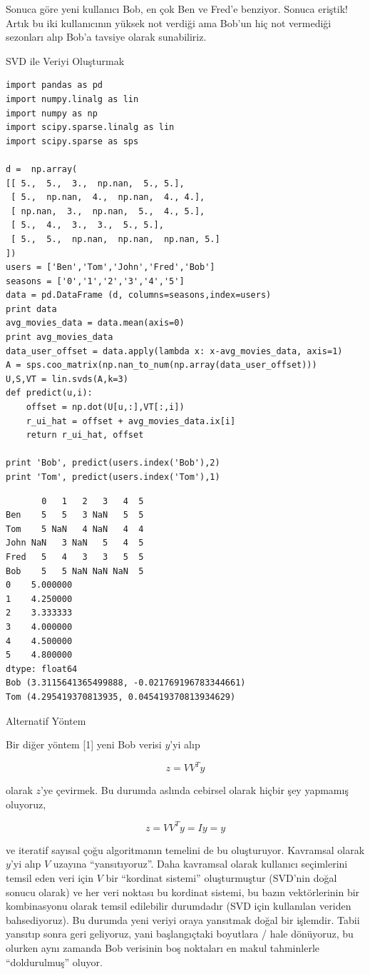 \documentclass[12pt,fleqn]{article}\usepackage{../../common}
\begin{document}
Sonuca göre yeni kullanıcı Bob, en çok Ben ve Fred'e benziyor. Sonuca
eriştik! Artık bu iki kullanıcının yüksek not verdiği ama Bob'un hiç
not vermediği sezonları alıp Bob'a tavsiye olarak sunabiliriz.

SVD ile Veriyi Oluşturmak

\begin{verbatim}
import pandas as pd
import numpy.linalg as lin
import numpy as np
import scipy.sparse.linalg as lin
import scipy.sparse as sps

d =  np.array(
[[ 5.,  5.,  3.,  np.nan,  5., 5.],
 [ 5.,  np.nan,  4.,  np.nan,  4., 4.],
 [ np.nan,  3.,  np.nan,  5.,  4., 5.],
 [ 5.,  4.,  3.,  3.,  5., 5.],
 [ 5.,  5.,  np.nan,  np.nan,  np.nan, 5.]
])
users = ['Ben','Tom','John','Fred','Bob']
seasons = ['0','1','2','3','4','5']
data = pd.DataFrame (d, columns=seasons,index=users)
print data
avg_movies_data = data.mean(axis=0)
print avg_movies_data
data_user_offset = data.apply(lambda x: x-avg_movies_data, axis=1)
A = sps.coo_matrix(np.nan_to_num(np.array(data_user_offset)))
U,S,VT = lin.svds(A,k=3)
def predict(u,i):
    offset = np.dot(U[u,:],VT[:,i]) 
    r_ui_hat = offset + avg_movies_data.ix[i] 
    return r_ui_hat, offset

print 'Bob', predict(users.index('Bob'),2)
print 'Tom', predict(users.index('Tom'),1)
\end{verbatim}

\begin{verbatim}
       0   1   2   3   4  5
Ben    5   5   3 NaN   5  5
Tom    5 NaN   4 NaN   4  4
John NaN   3 NaN   5   4  5
Fred   5   4   3   3   5  5
Bob    5   5 NaN NaN NaN  5
0    5.000000
1    4.250000
2    3.333333
3    4.000000
4    4.500000
5    4.800000
dtype: float64
Bob (3.3115641365499888, -0.021769196783344661)
Tom (4.295419370813935, 0.045419370813934629)
\end{verbatim}

Alternatif Yöntem

Bir diğer yöntem [1] yeni Bob verisi $y$'yi alıp

$$ z = VV^Ty $$

olarak $z$'ye çevirmek. Bu durumda aslında cebirsel olarak hiçbir şey
yapmamış oluyoruz,

$$ z = VV^Ty = Iy = y$$

ve iteratif sayısal çoğu algoritmanın temelini de bu oluşturuyor. Kavramsal
olarak $y$'yi alıp $V$ uzayına ``yansıtıyoruz''. Daha kavramsal olarak kullanıcı
seçimlerini temsil eden veri için $V$ bir ``kordinat sistemi'' oluşturmuştur
(SVD'nin doğal sonucu olarak) ve her veri noktası bu kordinat sistemi, bu bazın
vektörlerinin bir kombinasyonu olarak temsil edilebilir durumdadır (SVD için
kullanılan veriden bahsediyoruz). Bu durumda yeni veriyi oraya yansıtmak doğal
bir işlemdir. Tabii yansıtıp sonra geri geliyoruz, yani başlangıçtaki boyutlara
/ hale dönüyoruz, bu olurken aynı zamanda Bob verisinin boş noktaları en makul
tahminlerle ``doldurulmuş'' oluyor.
\end{document}
